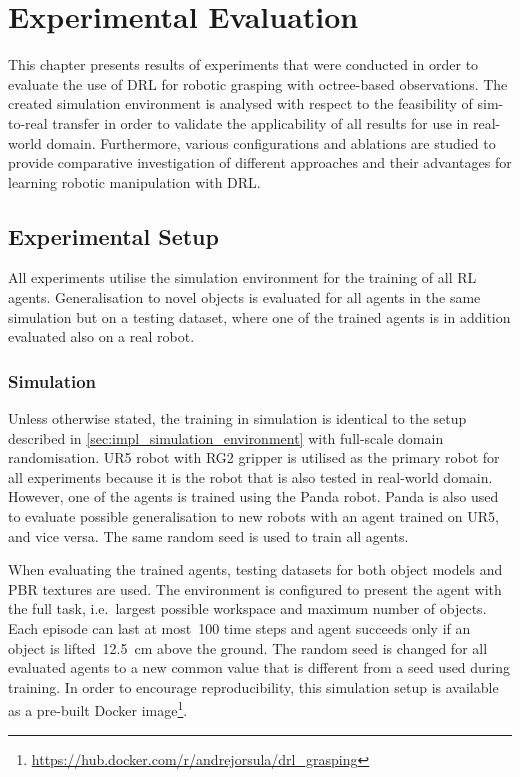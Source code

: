 \chapter{Experimental Evaluation}\label{ch:experimental_evaluation}

This chapter presents results of experiments that were conducted in order to evaluate the use of DRL for robotic grasping with octree-based observations. The created simulation environment is analysed with respect to the feasibility of sim-to-real transfer in order to validate the applicability of all results for use in real-world domain. Furthermore, various configurations and ablations are studied to provide comparative investigation of different approaches and their advantages for learning robotic manipulation with DRL.


\section{Experimental Setup}

All experiments utilise the simulation environment for the training of all RL agents. Generalisation to novel objects is evaluated for all agents in the same simulation but on a testing dataset, where one of the trained agents is in addition evaluated also on a real robot.


\subsection{Simulation}

Unless otherwise stated, the training in simulation is identical to the setup described in \autoref{sec:impl_simulation_environment} with full-scale domain randomisation. UR5 robot with RG2 gripper is utilised as the primary robot for all experiments because it is the robot that is also tested in real-world domain. However, one of the agents is trained using the Panda robot. Panda is also used to evaluate possible generalisation to new robots with an agent trained on UR5, and vice versa. The same random seed is used to train all agents.

When evaluating the trained agents, testing datasets for both object models and PBR textures are used. The environment is configured to present the agent with the full task, i.e.~largest possible workspace and maximum number of objects. Each episode can last at most~100 time steps and agent succeeds only if an object is lifted~12.5~cm above the ground. The random seed is changed for all evaluated agents to a new common value that is different from a seed used during training. In order to encourage reproducibility, this simulation setup is available as a pre-built Docker image\footnote{\href{https://hub.docker.com/r/andrejorsula/drl_grasping}{https://hub.docker.com/r/andrejorsula/drl\_grasping}}.


